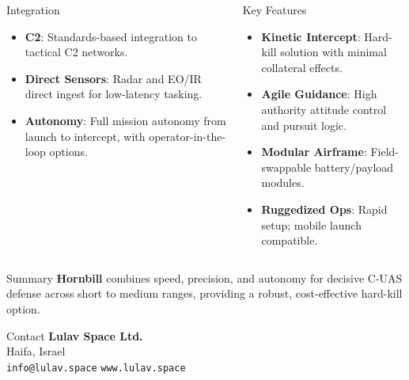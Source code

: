 \documentclass[english,final,hyperref={pdfpagelabels=false}]{beamer}
\begin{document}
\begin{frame}{ }
\begin{columns}[t]
\begin{block}{\Large Integration}
\begin{itemize}
    \item \textbf{C2}: Standards-based integration to tactical C2 networks.
    \item \textbf{Direct Sensors}: Radar and EO/IR direct ingest for low-latency tasking.
    \item \textbf{Autonomy}: Full mission autonomy from launch to intercept, with operator-in-the-loop options.
\end{itemize}
\end{block}

\begin{block}{\Large Key Features}
\begin{itemize}
    \item \textbf{Kinetic Intercept}: Hard-kill solution with minimal collateral effects.
    \item \textbf{Agile Guidance}: High authority attitude control and pursuit logic.
    \item \textbf{Modular Airframe}: Field-swappable battery/payload modules.
    \item \textbf{Ruggedized Ops}: Rapid setup; mobile launch compatible.
\end{itemize}
\end{block}

\end{columns}

\vfill

\begin{block}{\Large Summary}
\large \textbf{Hornbill} combines speed, precision, and autonomy for decisive C-UAS defense across short to medium ranges, providing a robust, cost-effective hard-kill option.
\end{block}

\begin{block}{\Large Contact}
\textbf{Lulav Space Ltd.}\\
Haifa, Israel\\
\texttt{info@lulav.space} \quad \texttt{www.lulav.space}
\end{block}

\end{frame}
\end{document}
